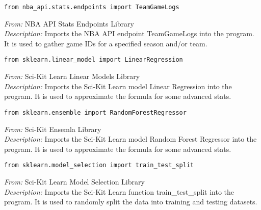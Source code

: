 \documentclass{article}
\begin{document}
\begin{lstlisting}
from nba_api.stats.endpoints import TeamGameLogs
\end{lstlisting}
\textit{From:} NBA API Stats Endpoints Library\\
\textit{Description:} Imports the NBA API endpoint TeamGameLogs into the program. It is used to gather game IDs for a specified season and/or team.

\begin{lstlisting}
from sklearn.linear_model import LinearRegression
\end{lstlisting}
\textit{From:} Sci-Kit Learn Linear Models Library\\
\textit{Description:} Imports the Sci-Kit Learn model Linear Regression into the program. It is used to approximate the formula for some advanced stats.

\begin{lstlisting}
from sklearn.ensemble import RandomForestRegressor
\end{lstlisting}
\textit{From:} Sci-Kit Ensemla Library\\
\textit{Description:} Imports the Sci-Kit Learn model Random Forest Regressor into the program. It is used to approximate the formula for some advanced stats.

\begin{lstlisting}
from sklearn.model_selection import train_test_split
\end{lstlisting}
\textit{From:} Sci-Kit Learn Model Selection Library\\
\textit{Description:} Imports the Sci-Kit Learn function train\_test\_split into the program. It is used to randomly split the data into training and testing datasets.
\end{document}
